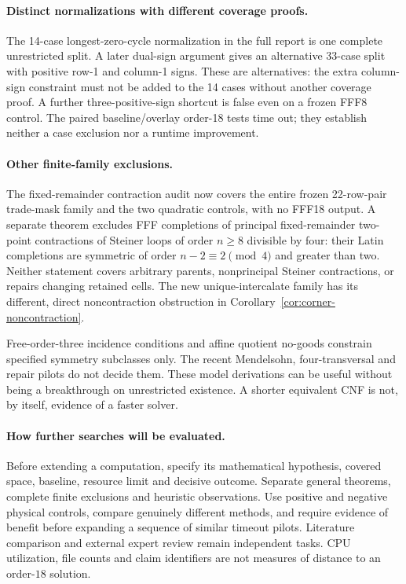 \paragraph{Distinct normalizations with different coverage proofs.}
The 14-case longest-zero-cycle normalization in the full report is
one complete unrestricted split. A later dual-sign argument gives an
alternative 33-case split with positive row-1 and column-1 signs.
These are alternatives: the extra column-sign constraint must not
be added to the 14 cases without another coverage proof. A further
three-positive-sign shortcut is false even on a frozen FFF8 control.
The paired baseline/overlay order-18 tests time out; they establish
neither a case exclusion nor a runtime improvement.

\paragraph{Other finite-family exclusions.}
The fixed-remainder contraction audit now covers the entire frozen
22-row-pair trade-mask family and the two quadratic controls, with
no FFF18 output. A separate theorem excludes FFF completions of principal
fixed-remainder two-point contractions of Steiner loops of order
$n\geq8$ divisible by four: their Latin completions are symmetric
of order $n-2\equiv2\pmod4$ and greater than two. Neither statement covers arbitrary
parents, nonprincipal Steiner contractions, or repairs changing
retained cells. The new unique-intercalate family has its different,
direct noncontraction obstruction in Corollary~\ref{cor:corner-noncontraction}.

Free-order-three incidence conditions and affine quotient no-goods
constrain specified symmetry subclasses only. The recent Mendelsohn,
four-transversal and repair pilots do not decide them. These model
derivations can be useful without being a breakthrough on unrestricted
existence. A shorter equivalent CNF is not, by itself, evidence of
a faster solver.

\paragraph{How further searches will be evaluated.}
Before extending a computation, specify its mathematical hypothesis,
covered space, baseline, resource limit and decisive outcome. Separate
general theorems, complete finite exclusions and heuristic observations.
Use positive and negative physical controls, compare genuinely different
methods, and require evidence of benefit before expanding a sequence
of similar timeout pilots. Literature comparison and external expert
review remain independent tasks. CPU utilization, file counts and
claim identifiers are not measures of distance to an order-$18$ solution.
